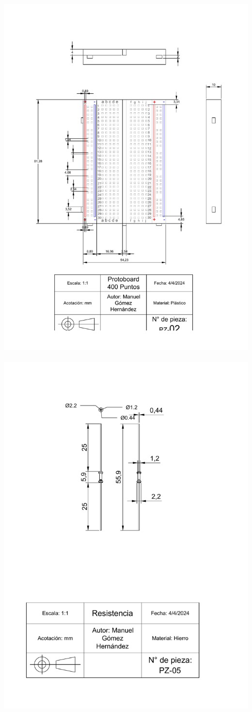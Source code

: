 \includegraphics[width=.9\textwidth]{15/img/placaProtoboardTrazo.pdf}~\\[15cm]
\includegraphics[width=.9\textwidth]{15/img/resistenciaTrazo.pdf}~\\[15cm]



